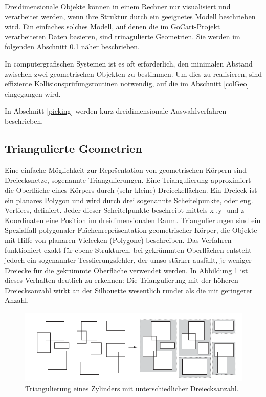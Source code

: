 Dreidimensionale Objekte k\"onnen in einem Rechner nur visualisiert und verarbeitet werden, wenn ihre Struktur durch ein geeignetes Modell beschrieben wird. Ein einfaches solches Modell, auf denen die im GoCart-Projekt verarbeiteten Daten basieren, sind trinagulierte Geometrien. Sie werden im folgenden Abschnitt \ref{triGeo} n\"aher beschrieben.

In computergrafischen Systemen ist es oft erforderlich, den minimalen Abstand zwischen zwei geometrischen Objekten zu bestimmen. Um dies zu realisieren, sind effiziente Kollisionspr\"ufungsroutinen notwendig, auf die im Abschnitt \ref{colGeo} eingegangen wird.
 
In Abschnitt \ref{picking} werden kurz dreidimensionale Auswahlverfahren beschrieben.
 
\subsection{Triangulierte Geometrien}
\label{triGeo}

Eine einfache M\"oglichkeit zur Repr\"sentation von geometrischen K\"orpern sind Dreiecksnetze, sogenannte Triangulierungen. Eine Triangulierung approximiert die Oberfl\"ache eines K\"orpers durch (sehr kleine) Dreieckefl\"achen. Ein Dreieck ist ein planares Polygon und wird durch drei sogenannte Scheitelpunkte, oder eng. Vertices, definiert. Jeder dieser Scheitelpunkte beschreibt mittels x-,y- und z-Koordinaten eine Position im dreidimensionalen Raum. Triangulierungen sind ein Spezialfall polygonaler Flächenrepräsentation geometrischer K\"orper, die Objekte mit Hilfe von planaren Vielecken (Polygone) beschreiben. Das Verfahren funktioniert exakt f\"ur ebene Strukturen, bei gekrümmten Oberfl\"achen entsteht jedoch ein sogenannter Tesslierungsfehler, der umso stärker ausf\"allt, je weniger Dreiecke für die gekr\"ummte Oberfl\"ache verwendet werden. In Abbildung \ref{triangulation} ist dieses Verhalten deutlich zu erkennen: Die Triangulierung mit der h\"oheren Dreiecksanzahl wirkt an der Silhouette wesentlich runder als die mit geringerer Anzahl. 

\begin{figure}[H]
\centerline{
	\includegraphics[width=0.7\columnwidth]{graphics/box.png}
}
\caption{Triangulierung eines Zylinders mit unterschiedlicher Dreiecksanzahl.}
\label{triangulation}
\end{figure}

